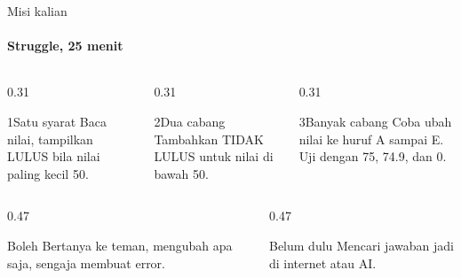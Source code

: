\documentclass[t]{beamer}
\begin{document}
\begin{frame}{Misi kalian}
\framesubtitle{Struggle, 25 menit}
\begin{columns}[T]
\begin{column}{0.31\textwidth}
\begin{Langkah}{1}{Satu syarat}
Baca nilai, tampilkan LULUS bila nilai paling kecil 50.
\end{Langkah}
\end{column}
\begin{column}{0.31\textwidth}
\begin{Langkah}{2}{Dua cabang}
Tambahkan TIDAK LULUS untuk nilai di bawah 50.
\end{Langkah}
\end{column}
\begin{column}{0.31\textwidth}
\begin{Langkah}{3}{Banyak cabang}
Coba ubah nilai ke huruf A sampai E. Uji dengan 75, 74.9, dan 0.
\end{Langkah}
\end{column}
\end{columns}
\vspace{8pt}
\begin{columns}[T]
\begin{column}{0.47\textwidth}
\begin{Blok}{Boleh}
Bertanya ke teman, mengubah apa saja, sengaja membuat error.
\end{Blok}
\end{column}
\begin{column}{0.47\textwidth}
\begin{BlokAlert}{Belum dulu}
Mencari jawaban jadi di internet atau AI.
\end{BlokAlert}
\end{column}
\end{columns}
\end{frame}
\end{document}
